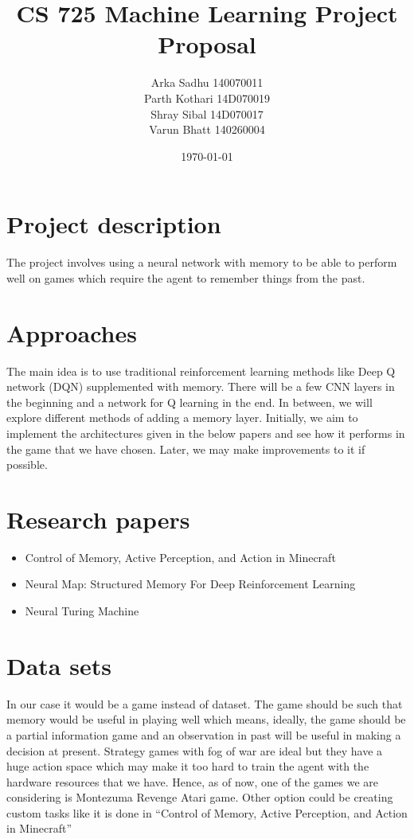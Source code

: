 \documentclass{article}
\title{CS 725 Machine Learning Project Proposal}
\author{
  Arka Sadhu 140070011\\
  Parth Kothari 14D070019\\
  Shray Sibal 14D070017\\
  Varun Bhatt 140260004\\}
\date{\today}
\begin{document}
\maketitle


\section{Project description}
The project involves using a neural network with memory to be able to perform well on games which require the agent to remember things from the past.

\section{Approaches}
The main idea is to use traditional reinforcement learning methods like Deep Q network (DQN) supplemented with memory. There will be a few CNN layers in the beginning and a network for Q learning in the end. In between, we will explore different methods of adding a memory layer. Initially, we aim to implement the architectures given in the below papers and see how it performs in the game that we have chosen. Later, we may make improvements to it if possible.

\section{Research papers}
\begin{itemize}
\item Control of Memory, Active Perception, and Action in Minecraft 
\item Neural Map: Structured Memory For Deep Reinforcement Learning 
\item Neural Turing Machine 
\end{itemize}


\section{Data sets}
In our case it would be a game instead of dataset. The game should be such that memory would be useful in playing well which means, ideally, the game should be a partial information game and an observation in past will be useful in making a decision at present. Strategy games with fog of war are ideal but they have a huge action space which may make it too hard to train the agent with the hardware resources that we have. Hence, as of now, one of the games we are considering is Montezuma Revenge Atari game. Other option could be creating custom tasks like it is done in “Control of Memory, Active Perception, and Action in Minecraft”
\end{document}
